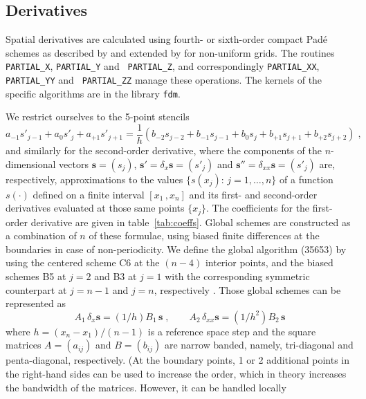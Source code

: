 \subsection{Derivatives}\label{sec:fdm}

Spatial derivatives are calculated using fourth- or sixth-order compact Pad\'{e}
schemes as described by \cite{Lele:1992} and extended by \cite{Shukla:2005} for
non-uniform grids. The routines {\tt PARTIAL\_X}, {\tt PARTIAL\_Y} and {\tt
  PARTIAL\_Z}, and correspondingly {\tt PARTIAL\_XX}, {\tt PARTIAL\_YY} and {\tt
  PARTIAL\_ZZ} manage these operations. The kernels of the specific algorithms
are in the library {\tt fdm}.

We restrict ourselves to the 5-point stencils
\begin{equation}
a_{-1}s'_{j-1}+a_{0}s'_{j}+a_{+1}s'_{j+1}=
\frac{1}{h}(b_{-2}s_{j-2}+b_{-1}s_{j-1}+b_{0}s_{j}+b_{+1}s_{j+1}+b_{+2}s_{j+2}) \;,
\label{equ:coefs}
\end{equation}
and similarly for the second-order derivative, where the components of the
$n$-dimensional vectors $\mathbf{s}=(s_j)$, $\mathbf{s'}=\delta_x
\mathbf{s}=(s'_j)$ and $\mathbf{s''}=\delta_{xx} \mathbf{s}=(s'_j)$ are,
respectively, approximations to the values $\{s(x_j):\, j=1,\ldots,n\}$ of a
function $s(\cdot)$ defined on a finite interval $[x_1\,,x_n]$ and its first-
and second-order derivatives evaluated at those same points $\{x_j\}$. The
coefficients for the first-order derivative are given in
table~\ref{tab:coeffs}. Global schemes are constructed as a combination of $n$ of
these formulae, using biased finite differences at the boundaries in case of
non-periodicity.  We define the global algorithm (35653) by using the centered
scheme C6 at the $(n-4)$ interior points, and the biased schemes B5 at $j=2$ and
B3 at $j=1$ with the corresponding symmetric counterpart at $j=n-1$ and $j=n$,
respectively \cite{Carpenter:1993}. Those global schemes can be represented as
\begin{equation}
  A_1\, \delta_x \mathbf{s}=(1/h)B_1\, \mathbf{s} \;, \qquad
  A_2\, \delta_{xx} \mathbf{s}=(1/h^2)B_2\, \mathbf{s}
\label{equ:fdm}
\end{equation}
where $h=(x_n-x_1)/(n-1)$ is a reference space step and the square matrices
$A=(a_{ij})$ and $B=(b_{ij})$ are narrow banded, namely, tri-diagonal and
penta-diagonal, respectively. (At the boundary points, 1 or 2 additional points
in the right-hand sides can be used to increase the order, which in theory
increases the bandwidth of the matrices. However, it can be handled locally
